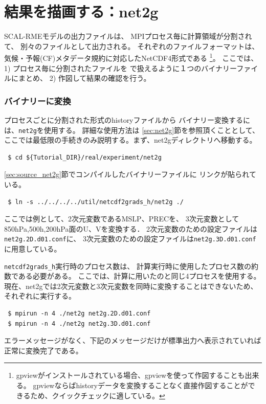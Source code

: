 \section{結果を描画する：net2g} \label{sec:quicklook}

SCAL-RMEモデルの出力ファイルは、
MPIプロセス毎に計算領域が分割されて、
別々のファイルとして出力される。
それぞれのファイルフォーマットは、
気候・予報(CF)メタデータ規約に対応したNetCDF4形式である
\footnote{gpviewがインストールされている場合、gpviewを使って作図することも出来る。
gpviewならばhistoryデータを変換することなく直接作図することができるため、クイックチェックに適している。}。
ここでは、1) プロセス毎に分割された{\netcdf}ファイルを
{\grads}で扱えるように１つのバイナリーファイルにまとめ、
2) 作図して結果の確認を行う。

\subsubsection{{\grads}バイナリーに変換}
プロセスごとに分割された{\netcdf}形式のhistoryファイルから
{\grads}バイナリー変換するには、\verb|net2g|を使用する。
詳細な使用方法は \ref{sec:net2g}節を参照頂くこととして、
ここでは最低限の手続きのみ説明する。まず、net2gディレクトリへ移動する。
\begin{verbatim}
 $ cd ${Tutorial_DIR}/real/experiment/net2g
\end{verbatim}

\ref{sec:source_net2g}節でコンパイルしたバイナリーファイルに
リンクが貼られている。
\begin{verbatim}
 $ ln -s ../../../../util/netcdf2grads_h/net2g ./
\end{verbatim}
ここでは例として、2次元変数であるMSLP、PRECを、
3次元変数として850hPa,500h,200hPa面のU、Vを変換する．
2次元変数のための設定ファイルは\verb|net2g.2D.d01.conf|に、
3次元変数のための設定ファイルは\verb|net2g.3D.d01.conf|に用意している。

\verb|netcdf2grads_h|実行時のプロセス数は、
計算実行時に使用したプロセス数の約数である必要がある。
ここでは、計算に用いたのと同じ4プロセスを使用する。
現在、net2gでは2次元変数と3次元変数を同時に変換することはできないため、
それぞれに実行する。
\begin{verbatim}
 $ mpirun -n 4 ./net2g net2g.2D.d01.conf
 $ mpirun -n 4 ./net2g net2g.3D.d01.conf
\end{verbatim}
エラーメッセージがなく、下記のメッセージだけが標準出力へ表示されていれば正常に変換完了である。\\

